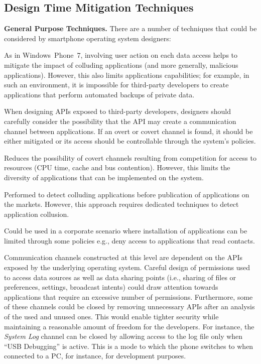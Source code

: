 \subsection{Design Time Mitigation Techniques}

{\bf General Purpose Techniques.} There are a number of techniques
that could be considered by smartphone operating system designers:

 As in
Windows~Phone~7, involving user action on each data access helps to
mitigate the impact of colluding applications (and more generally,
malicious applications). However, this also limits applications
capabilities; for example, in such an environment, it is impossible
for third-party developers to create applications that perform
automated backups of private data.

 When designing APIs exposed to
third-party developers, designers should carefully consider the
possibility that the API may create a communication channel between
applications. If an overt or covert channel is found, it should be
either mitigated or its access should be controllable through the
system's policies.

 Reduces the possibility of
covert channels resulting from competition for access to resources
(CPU time, cache and bus contention). However, this limits the
diversity of applications that can be implemented on the system.

 Performed to detect colluding
applications before publication of applications on the
markets. However, this approach requires dedicated techniques to
detect application collusion.

 Could be used in
a corporate scenario where installation of applications can be limited
through some policies e.g., deny access to applications that read
contacts.

 Communication channels
constructed at this level are dependent on the APIs exposed by the
underlying operating system. Careful design of permissions used to
access data sources as well as data sharing points (i.e., sharing of
files or preferences, settings, broadcast intents) could draw
attention towards applications that require an excessive number of
permissions. Furthermore, some of these channels could be closed by
removing unnecessary APIs after an analysis of the used and unused
ones. This would enable tighter security while maintaining a
reasonable amount of freedom for the developers. For instance, the
\emph{System Log} channel can be closed by allowing access to the log
file only when ``USB Debugging'' is active. This is a mode to which
the phone switches to when connected to a PC, for instance, for
development purposes.

